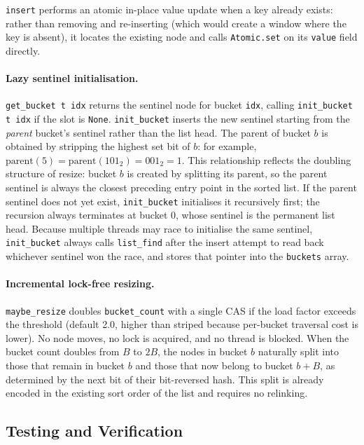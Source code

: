 \documentclass[11pt,a4paper]{article}
\begin{document}
\texttt{insert} performs an atomic in-place value update when a key already
exists: rather than removing and re-inserting (which would create a window
where the key is absent), it locates the existing node and calls
\texttt{Atomic.set} on its \texttt{value} field directly.

\paragraph{Lazy sentinel initialisation.}
\texttt{get\_bucket t idx} returns the sentinel node for bucket \texttt{idx},
calling \texttt{init\_bucket t idx} if the slot is \texttt{None}.
\texttt{init\_bucket} inserts the new sentinel starting from the
\emph{parent} bucket's sentinel rather than the list head. The parent of
bucket $b$ is obtained by stripping the highest set bit of $b$:
for example, $\text{parent}(5) = \text{parent}(101_2) = 001_2 = 1$.
This relationship reflects the doubling structure of resize: bucket $b$ is
created by splitting its parent, so the parent sentinel is always the
closest preceding entry point in the sorted list. If the parent sentinel
does not yet exist, \texttt{init\_bucket} initialises it recursively first;
the recursion always terminates at bucket 0, whose sentinel is the permanent
list head. Because multiple threads may race to initialise the same sentinel,
\texttt{init\_bucket} always calls \texttt{list\_find} after the insert attempt
to read back whichever sentinel won the race, and stores that pointer into the
\texttt{buckets} array.

\paragraph{Incremental lock-free resizing.}
\texttt{maybe\_resize} doubles \texttt{bucket\_count} with a single CAS if the
load factor exceeds the threshold (default 2.0, higher than striped because
per-bucket traversal cost is lower). No node moves, no lock is acquired, and
no thread is blocked. When the bucket count doubles from $B$ to $2B$, the
nodes in bucket $b$ naturally split into those that remain in bucket $b$ and
those that now belong to bucket $b + B$, as determined by the next bit of
their bit-reversed hash. This split is already encoded in the existing sort
order of the list and requires no relinking.

\subsection{Testing and Verification}
\label{sec:testing}
\end{document}
